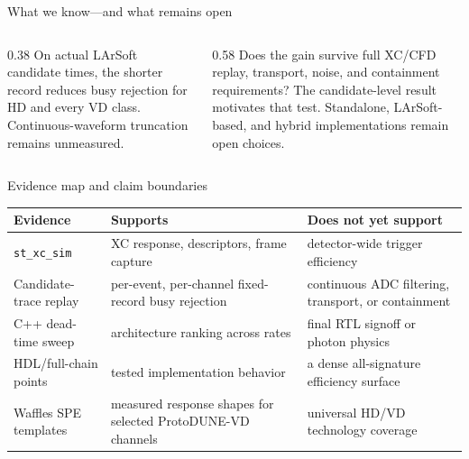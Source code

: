 \documentclass[aspectratio=169,11pt]{beamer}
\begin{document}
\begin{frame}{What we know—and what remains open}
  \begin{columns}[T,onlytextwidth]
    \begin{column}{0.38\textwidth}
        {On actual LArSoft candidate times, the shorter record reduces busy rejection for HD and every VD class. Continuous-waveform truncation remains unmeasured.}
    \end{column}
    \begin{column}{0.58\textwidth}
        {Does the gain survive full XC/CFD replay, transport, noise, and containment requirements?}
        {The candidate-level result motivates that test. Standalone, LArSoft-based, and hybrid implementations remain open choices.}
    \end{column}
  \end{columns}
\end{frame}

\appendix

\begin{frame}{Evidence map and claim boundaries}
  \footnotesize
  \begin{tabular}{@{}p{}p{}p{}@{}}
    \toprule
    Evidence & Supports & Does not yet support \\
    \midrule
    \texttt{st\_xc\_sim} & XC response, descriptors, frame capture & detector-wide trigger efficiency \\
    Candidate-trace replay & per-event, per-channel fixed-record busy rejection & continuous ADC filtering, transport, or containment \\
    C++ dead-time sweep & architecture ranking across rates & final RTL signoff or photon physics \\
    HDL/full-chain points & tested implementation behavior & a dense all-signature efficiency surface \\
    Waffles SPE templates & measured response shapes for selected ProtoDUNE-VD channels & universal HD/VD technology coverage \\
    \bottomrule
  \end{tabular}

  \medskip
\end{frame}
\end{document}
